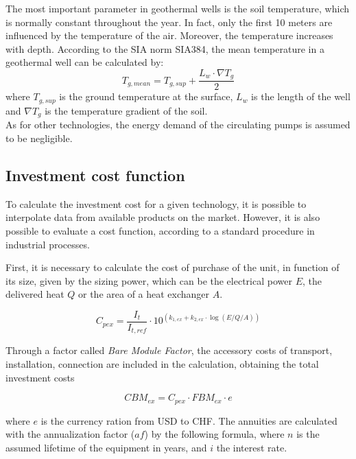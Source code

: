 \documentclass{article}
\begin{document}
The most important parameter in geothermal wells is the soil temperature, which is normally constant throughout the year. In fact, only the first 10 meters are influenced by the temperature of the air\cite{hanSensitivityAnalysisVertical2016}. Moreover, the temperature increases with depth. According to the SIA norm SIA384\cite{siaSIA384Sondes2010}, the mean temperature in a geothermal well can be calculated by:
\begin{equation}
T_{g, mean} = T_{g,sup} + \frac{L_{w} \cdot \nabla T_{g}}{2}
\end{equation}
where $T_{g,sup}$ is the ground temperature at the surface, $L_{w}$ is the length of the well and $ \nabla T_{g}$ is the temperature gradient of the soil.\\

As for other technologies, the energy demand of the circulating pumps is assumed to be negligible. 

\subsection{Investment cost function}\label{ss:ic}
To calculate the investment cost for a given technology, it is possible to interpolate data from available products on the market. However, it is also possible to evaluate a cost function, according to a standard procedure in industrial processes\cite{turtonrichardc.bailierichardwhitingwallace.AnalysisSynthesisDesign2003}.

First, it is necessary to calculate the cost of purchase of the unit, in function of its size, given by the sizing power, which can be the electrical power $E$, the delivered heat $Q$ or the area of a heat exchanger $A$.

\begin{equation}
C_{pex} = \frac{I_{t}}{I_{t,ref}} \cdot 10^ {(k_{1,ex} + k_{2,ex} \cdot \log(E/Q/A))}
\end{equation}

Through a factor called \emph{Bare Module Factor}, the accessory costs of transport, installation, connection are included in the calculation, obtaining the total investment costs

\begin{equation}
CBM_{ex} = C_{pex} \cdot FBM_{ex} \cdot e 
\end{equation}

where $e$ is the currency ration from USD to CHF. The annuities are calculated with the annualization factor ($af$) by the following formula, where $n$ is the assumed lifetime of the equipment in years, and $i$ the interest rate. 
\end{document}
